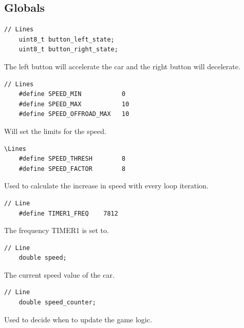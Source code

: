 \documentclass{article}
\begin{document}
\subsection*{Globals}
\begin{lstlisting}[style=CStyle]
	// Lines
	uint8_t button_left_state;
	uint8_t button_right_state;
\end{lstlisting}
The left button will accelerate the car and the right button will decelerate.
\begin{lstlisting}[style=CStyle]
	// Lines
	#define SPEED_MIN           0      
	#define SPEED_MAX           10
	#define SPEED_OFFROAD_MAX   10
\end{lstlisting}
Will set the limits for the speed.
\begin{lstlisting}[style=CStyle]
	\Lines 
	#define SPEED_THRESH        8
	#define SPEED_FACTOR        8
\end{lstlisting}
Used to calculate the increase in speed with every loop iteration.
\begin{lstlisting}[style=CStyle]
	// Line
	#define TIMER1_FREQ    7812
\end{lstlisting}
The frequency TIMER1 is set to. 
\begin{lstlisting}[style=CStyle]
	// Line
	double speed;
\end{lstlisting}
The current speed value of the car.
\begin{lstlisting}[style=CStyle]
	// Line
	double speed_counter;
\end{lstlisting}
Used to decide when to update the game logic. 
\newline
\end{document}
